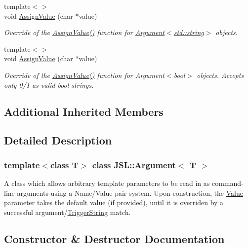 \begin{DoxyCompactItemize}
{\footnotesize template$<$$>$ }\\void \hyperlink{classJSL_1_1Argument_a1b443f8b8948e7aaec2154ed15e6f08f}{Assign\+Value} (char $\ast$value)
\begin{DoxyCompactList}\small\item\em Override of the \hyperlink{classJSL_1_1Argument_abc43696d406a6d369cd1b3d8cb1540b5}{Assign\+Value()} function for \hyperlink{classJSL_1_1Argument_ab438509a3c030516de72f3f493295bd5}{Argument$<$std\+::string$>$} objects. \end{DoxyCompactList}\item 
{\footnotesize template$<$$>$ }\\void \hyperlink{classJSL_1_1Argument_ac71e37555de1dea3b6d297bf0909a920}{Assign\+Value} (char $\ast$value)
\begin{DoxyCompactList}\small\item\em Override of the \hyperlink{classJSL_1_1Argument_abc43696d406a6d369cd1b3d8cb1540b5}{Assign\+Value()} function for Argument$<$bool$>$ objects. Accepts only 0/1 as valid bool-\/strings. \end{DoxyCompactList}\end{DoxyCompactItemize}
\subsection*{Additional Inherited Members}


\subsection{Detailed Description}
\subsubsection*{template$<$class T$>$\newline
class J\+S\+L\+::\+Argument$<$ T $>$}

A class which allows arbitrary template parameters to be read in as command-\/line arguments using a Name/\+Value pair system. Upon construction, the \hyperlink{classJSL_1_1Argument_a83ada5bfa412192f76dd4290f679defd}{Value} parameter takes the default value (if provided), until it is overriden by a successful argument/\hyperlink{classJSL_1_1ArgumentInterface_afa2d1f96c4971070d3de5824f297312f}{Trigger\+String} match. 

\subsection{Constructor \& Destructor Documentation}
\mbox{\label{classJSL_1_1Argument_ab438509a3c030516de72f3f493295bd5}} 
